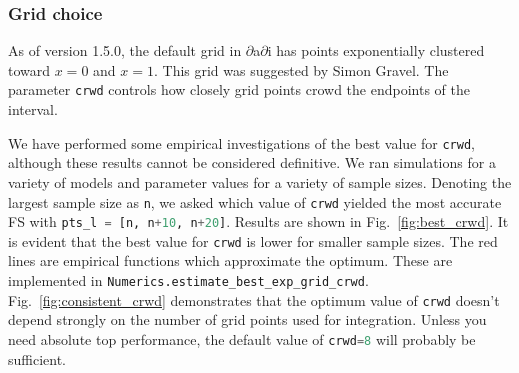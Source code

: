 \documentclass[12pt]{article}
\makeatletter
\newcommand{\dadi}{$\partial$a$\partial$i\xspace}
\newcommand{\py}[1]{\lstinline[language=Python, showstringspaces=False]@#1@}
\makeatother
\begin{document}
\subsubsection{Grid choice}
As of version 1.5.0, the default grid in \dadi has points exponentially clustered toward $x=0$ and $x=1$.
This grid was suggested by Simon Gravel.
The parameter \py{crwd} controls how closely grid points crowd the endpoints of the interval.

We have performed some empirical investigations of the best value for \py{crwd}, although these results cannot be considered definitive.
We ran simulations for a variety of models and parameter values for a variety of sample sizes.
Denoting the largest sample size as \py{n}, we asked which value of \py{crwd} yielded the most accurate FS with \py{pts_l = [n, n+10, n+20]}.
Results are shown in Fig.~\ref{fig:best_crwd}.
It is evident that the best value for \py{crwd} is lower for smaller sample sizes.
The red lines are empirical functions which approximate the optimum.
These are implemented in \py{Numerics.estimate_best_exp_grid_crwd}.
Fig.~\ref{fig:consistent_crwd} demonstrates that the optimum value of \py{crwd} doesn't depend strongly on the number of grid points used for integration.
Unless you need absolute top performance, the default value of \py{crwd=8} will probably be sufficient.
\end{document}
